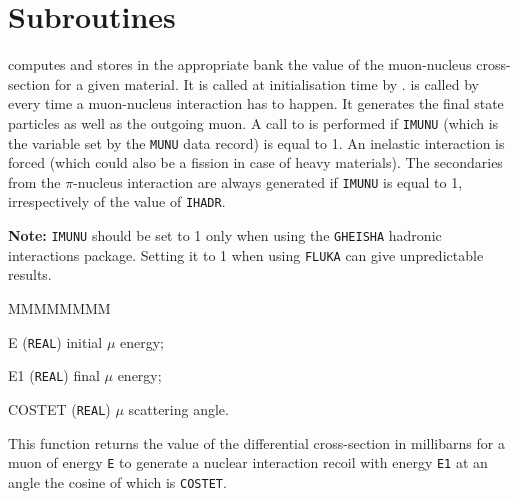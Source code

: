      
\section{Subroutines}
 computes and stores in the appropriate bank the value of
the muon-nucleus cross-section for a given material.
It is called at initialisation time by .
 is called by  every time a muon-nucleus interaction
has to happen. It generates the final state particles as well as the outgoing
muon. A call to  is performed if {\tt IMUNU} (which is the
variable set by the {\tt  MUNU} data record) is equal to 1. 
An inelastic interaction is forced (which could also be a fission in case 
of heavy materials).
The secondaries from the $\pi$-nucleus interaction are always generated
if {\tt IMUNU}
is equal to 1, irrespectively of the value of {\tt IHADR}.

{\bf Note:} {\tt IMUNU} should be set to 1 only when using the {\tt GHEISHA}
hadronic interactions package. Setting it to 1 when using {\tt FLUKA} can
give unpredictable results.

\begin{DLtt}{MMMMMMMM}
\item[E] ({\tt REAL}) initial $\mu$ energy;
\item[E1] ({\tt REAL}) final $\mu$ energy;
\item[COSTET] ({\tt REAL}) $\mu$ scattering angle.
\end{DLtt}
This function returns the value of the differential cross-section in
millibarns for a muon of energy {\tt E} to generate 
a nuclear interaction recoil with
energy {\tt E1} at an angle the cosine of which is
{\tt COSTET}.

